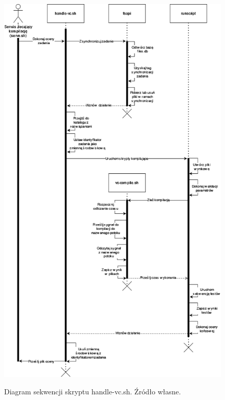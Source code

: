 \begin{figure}[!h]
	\begin{center}
		\resizebox{0.9\textwidth}{!} {
			\includegraphics{img/2/handle.png}
		}
		\caption[Diagram sekwencji skryptu handle-vc.sh]{Diagram sekwencji skryptu handle-vc.sh. Źródło własne.}
	\end{center}
\end{figure}


